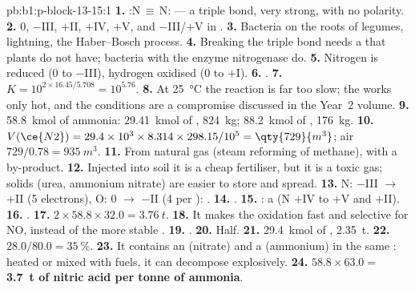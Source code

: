 \begin{solution}{pb:b1:p-block-13-15:1}
\textbf{1.} :N\,$\equiv$\,N: --- a triple bond, very strong, with no polarity.
\textbf{2.} 0, $-$III, $+$II, $+$IV, $+$V, and $-$III/$+$V in .
\textbf{3.} Bacteria on the roots of legumes, lightning, the Haber--Bosch
process.
\textbf{4.} Breaking the triple bond needs a  that plants do not
have; bacteria with the enzyme nitrogenase do.
\textbf{5.} Nitrogen is reduced (0 to $-$III), hydrogen oxidised (0 to $+$I).
\textbf{6.} .
\textbf{7.} $K = 10^{2 \times 16.45/5.708} = 10^{5.76}$.
\textbf{8.} At \qty{25}{\celsius} the reaction is far too slow; the
 works only hot, and the conditions are a compromise discussed in
the Year~2 volume.
\textbf{9.} \qty{58.8}{kmol} of ammonia: \qty{29.41}{kmol} of ,
\qty{824}{kg}; \qty{88.2}{kmol} of , \qty{176}{kg}.
\textbf{10.} $V(\ce{N2}) = 29.4 \times 10^3 \times 8.314 \times 298.15/10^5 =
\qty{729}{m^3}$; air $729/0.78 = \qty{935}{m^3}$.
\textbf{11.} From natural gas (steam reforming of methane), with a
 by-product.
\textbf{12.} Injected into soil it is a cheap fertiliser, but it is a toxic
gas; solids (urea, ammonium nitrate) are easier to store and spread.
\textbf{13.} N: $-$III $\to$ $+$II (5 electrons), O: 0 $\to$ $-$II (4 per
): .
\textbf{14.} .
\textbf{15.} : a  (N $+$IV to
$+$V and $+$II).
\textbf{16.} .
\textbf{17.} $2 \times 58.8 \times 32.0 = \qty{3.76}{t}$.
\textbf{18.} It makes the oxidation fast and selective for NO, instead of
the more stable .
\textbf{19.} .
\textbf{20.} Half.
\textbf{21.} \qty{29.4}{kmol} of , \qty{2.35}{t}.
\textbf{22.} $28.0/80.0 = \qty{35}{\percent}$.
\textbf{23.} It contains an  (nitrate) and a  (ammonium) in
the same : heated or mixed with fuels, it can decompose explosively.
\textbf{24.} $58.8 \times 63.0 =$ \textbf{\qty{3.7}{t} of nitric acid per tonne
of ammonia}.
\end{solution}
